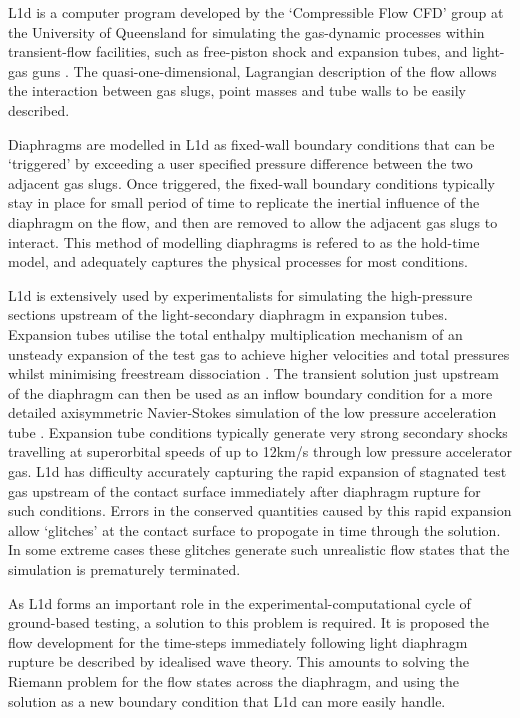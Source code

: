 \documentclass[a4paper,10pt]{article}
\begin{document}
L1d is a computer program developed by the `Compressible Flow CFD' group at the University of Queensland for simulating the gas-dynamic processes within transient-flow facilities, such as free-piston shock and expansion tubes, and light-gas guns \cite{jacobs_98b}.  The quasi-one-dimensional, Lagrangian description of the flow allows the interaction between gas slugs, point masses and tube walls to be easily described.
\par \medskip
Diaphragms are modelled in L1d as fixed-wall boundary conditions that can be `triggered' by exceeding a user specified pressure difference between the two adjacent gas slugs.  Once triggered, the fixed-wall boundary conditions typically stay in place for small period of time to replicate the inertial influence of the diaphragm on the flow, and then are removed to allow the adjacent gas slugs to interact.  This method of modelling diaphragms is refered to as the hold-time model, and adequately captures the physical processes for most conditions. 
\par \medskip
L1d is extensively used by experimentalists for simulating the high-pressure sections upstream of the light-secondary diaphragm in expansion tubes.  Expansion tubes utilise the total enthalpy multiplication mechanism of an unsteady expansion of the test gas to achieve higher velocities and total pressures whilst minimising freestream dissociation \cite{morgan_chapter}.  The transient solution just upstream of the diaphragm can then be used as an inflow boundary condition for a more detailed axisymmetric Navier-Stokes simulation of the low pressure acceleration tube \cite{jacobs_94}.  Expansion tube conditions typically generate very strong secondary shocks travelling at superorbital speeds of up to 12km/s through low pressure accelerator gas.  L1d has difficulty accurately capturing the rapid expansion of stagnated test gas upstream of the contact surface immediately after diaphragm rupture for such conditions.  Errors in the conserved quantities caused by this rapid expansion allow `glitches' at the contact surface to propogate in time through the solution.  In some extreme cases these glitches generate such unrealistic flow states that the simulation is prematurely terminated.
\par \medskip
As L1d forms an important role in the experimental-computational cycle of ground-based testing, a solution to this problem is required.  It is proposed the flow development for the time-steps immediately following light diaphragm rupture be described by idealised wave theory.  This amounts to solving the Riemann problem for the flow states across the diaphragm, and using the solution as a new boundary condition that L1d can more easily handle.
\end{document}

